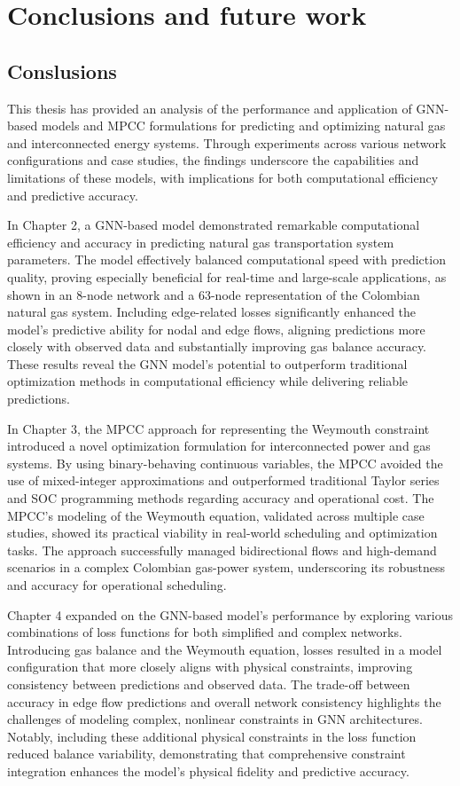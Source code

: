 \chapter{Conclusions and future work}

\section{Conslusions}
This thesis has provided an analysis of the performance and application of GNN-based models and MPCC formulations for predicting and optimizing natural gas and interconnected energy systems. Through experiments across various network configurations and case studies, the findings underscore the capabilities and limitations of these models, with implications for both computational efficiency and predictive accuracy.

In Chapter 2, a GNN-based model demonstrated remarkable computational efficiency and accuracy in predicting natural gas transportation system parameters. The model effectively balanced computational speed with prediction quality, proving especially beneficial for real-time and large-scale applications, as shown in an 8-node network and a 63-node representation of the Colombian natural gas system. Including edge-related losses significantly enhanced the model's predictive ability for nodal and edge flows, aligning predictions more closely with observed data and substantially improving gas balance accuracy. These results reveal the GNN model's potential to outperform traditional optimization methods in computational efficiency while delivering reliable predictions.

In Chapter 3, the MPCC approach for representing the Weymouth constraint introduced a novel optimization formulation for interconnected power and gas systems. By using binary-behaving continuous variables, the MPCC avoided the use of mixed-integer approximations and outperformed traditional Taylor series and SOC programming methods regarding accuracy and operational cost. The MPCC's modeling of the Weymouth equation, validated across multiple case studies, showed its practical viability in real-world scheduling and optimization tasks. The approach successfully managed bidirectional flows and high-demand scenarios in a complex Colombian gas-power system, underscoring its robustness and accuracy for operational scheduling.

Chapter 4 expanded on the GNN-based model's performance by exploring various combinations of loss functions for both simplified and complex networks. Introducing gas balance and the Weymouth equation, losses resulted in a model configuration that more closely aligns with physical constraints, improving consistency between predictions and observed data. The trade-off between accuracy in edge flow predictions and overall network consistency highlights the challenges of modeling complex, nonlinear constraints in GNN architectures. Notably, including these additional physical constraints in the loss function reduced balance variability, demonstrating that comprehensive constraint integration enhances the model's physical fidelity and predictive accuracy.


